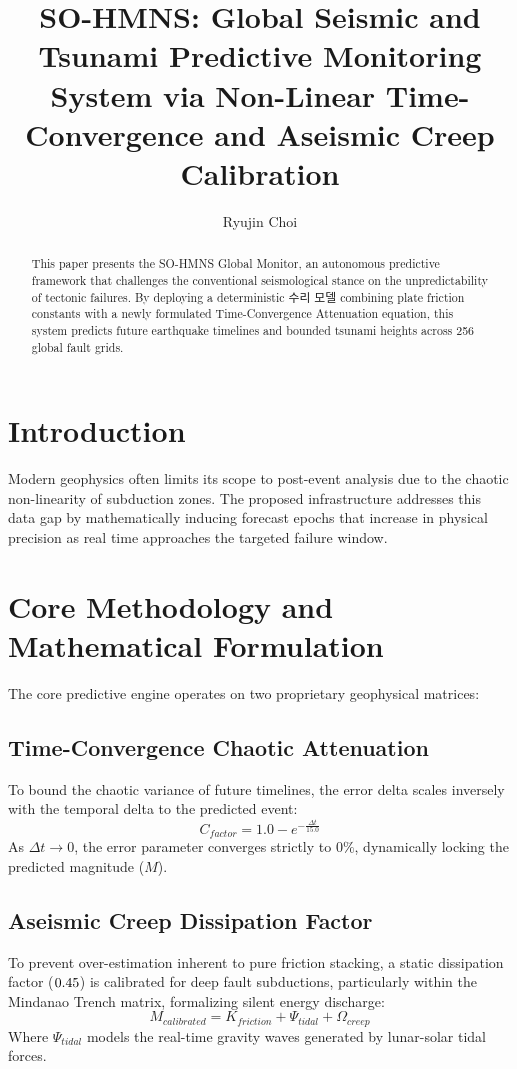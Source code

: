 \documentclass[10pt,journal,compsoc]{IEEEtran}
\begin{document}
\title{SO-HMNS: Global Seismic and Tsunami Predictive Monitoring System via Non-Linear Time-Convergence and Aseismic Creep Calibration}
\author{Ryujin Choi}

\maketitle

\begin{abstract}
This paper presents the SO-HMNS Global Monitor, an autonomous predictive framework that challenges the conventional seismological stance on the unpredictability of tectonic failures. By deploying a deterministic 수리 모델 combining plate friction constants with a newly formulated Time-Convergence Attenuation equation, this system predicts future earthquake timelines and bounded tsunami heights across 256 global fault grids.
\end{abstract}

\section{Introduction}
Modern geophysics often limits its scope to post-event analysis due to the chaotic non-linearity of subduction zones. The proposed infrastructure addresses this data gap by mathematically inducing forecast epochs that increase in physical precision as real time approaches the targeted failure window.

\section{Core Methodology and Mathematical Formulation}
The core predictive engine operates on two proprietary geophysical matrices:
\subsection{Time-Convergence Chaotic Attenuation}
To bound the chaotic variance of future timelines, the error delta scales inversely with the temporal delta to the predicted event:
\begin{equation}
C_{factor} = 1.0 - e^{-\frac{\Delta t}{15.0}}
\end{equation}
As $\Delta t \to 0$, the error parameter converges strictly to $0\%$, dynamically locking the predicted magnitude ($M$).

\subsection{Aseismic Creep Dissipation Factor}
To prevent over-estimation inherent to pure friction stacking, a static dissipation factor ($\-0.45$) is calibrated for deep fault subductions, particularly within the Mindanao Trench matrix, formalizing silent energy discharge:
\begin{equation}
M_{calibrated} = K_{friction} + \Psi_{tidal} + \Omega_{creep}
\end{equation}
Where $\Psi_{tidal}$ models the real-time gravity waves generated by lunar-solar tidal forces.
\end{document}
